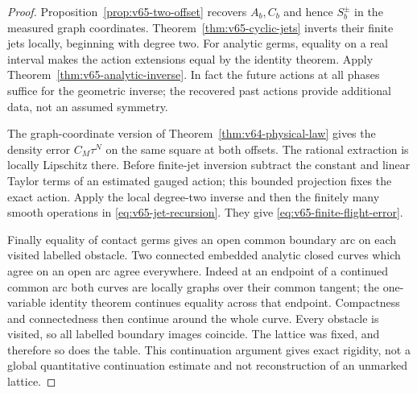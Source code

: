 \begin{proof}
Proposition~\ref{prop:v65-two-offset} recovers $A_b,C_b$ and hence
$S_b^\pm$ in the measured graph coordinates.  Theorem~\ref{thm:v65-cyclic-jets}
inverts their finite jets locally, beginning with degree two.
For analytic germs, equality on a real interval makes the action
extensions equal by the identity theorem.  Apply
Theorem~\ref{thm:v65-analytic-inverse}.  In fact the future actions at
all phases suffice for the geometric inverse; the recovered past actions
provide additional data, not an assumed symmetry.

The graph-coordinate version of Theorem~\ref{thm:v64-physical-law}
gives the density error $C_M\tau^N$ on the same square at both offsets.
The rational extraction is locally Lipschitz there.  Before finite-jet
inversion subtract the constant and linear Taylor terms of an estimated
gauged action; this bounded projection fixes the exact action.  Apply the
local degree-two inverse and then the finitely many smooth operations in
\eqref{eq:v65-jet-recursion}.  They give
\eqref{eq:v65-finite-flight-error}.

Finally equality of contact germs gives an open common boundary arc on
each visited labelled obstacle.  Two connected embedded analytic closed
curves which agree on an open arc agree everywhere.  Indeed at an endpoint
of a continued common arc both curves are locally graphs over their
common tangent; the one-variable identity theorem continues equality
across that endpoint.  Compactness and connectedness then continue around
the whole curve.  Every obstacle is visited, so all labelled boundary
images coincide.  The lattice was fixed, and therefore so does the table.
This continuation argument gives exact rigidity, not a global quantitative
continuation estimate and not reconstruction of an unmarked lattice.
\end{proof}

